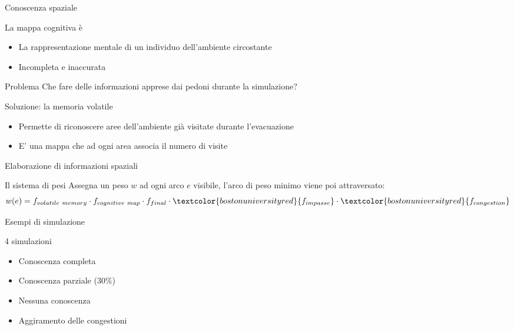 \documentclass{beamer}
\begin{document}
\begin{frame}{Conoscenza spaziale}
\begin{block}{La mappa cognitiva è}
\begin{itemize}
    \item La rappresentazione mentale di un individuo dell’ambiente circostante
    \item Incompleta e inaccurata
\end{itemize}
\end{block}
\begin{alertblock}{Problema}
Che fare delle informazioni apprese dai pedoni durante la simulazione?
\end{alertblock}
\begin{block}{Soluzione: la memoria volatile}
\begin{itemize}
    \item Permette di riconoscere aree dell'ambiente già visitate durante l'evacuazione
    \item E' una mappa che ad ogni area associa il numero di visite
\end{itemize}{}
\end{block}{}
\end{frame}{}

\begin{frame}{Elaborazione di informazioni spaziali}
\begin{block}{Il sistema di pesi}
Assegna un peso \(w\) ad ogni arco \(e\) visibile, l'arco di peso minimo viene poi attraversato:
\begin{equation}
    w(e) = f_{volatile\ memory}\cdot f_{cognitive\ map}\cdot f_{final}\cdot \textcolor{bostonuniversityred}{f_{impasse}}\cdot \textcolor{bostonuniversityred}{f_{congestion}}
\end{equation}{}
\end{block}
\end{frame}

\begin{frame}{Esempi di simulazione}
\begin{block}{4 simulazioni}
\begin{itemize}
    \item Conoscenza completa
    \item Conoscenza parziale (30\%)
    \item Nessuna conoscenza
    \item Aggiramento delle congestioni
\end{itemize}
\end{block}
\end{frame}
\end{document}
